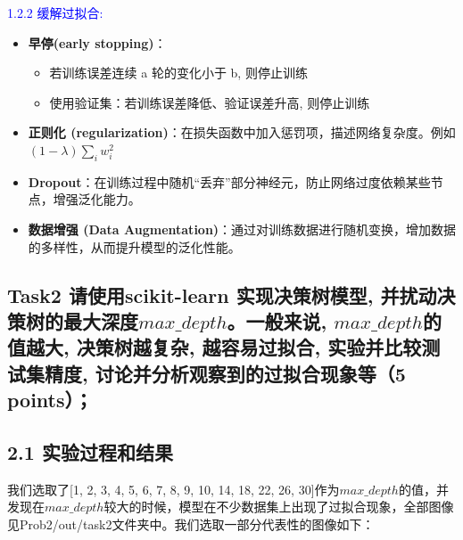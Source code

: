 \documentclass[8pt]{article}
\begin{document}
\textcolor{blue}{1.2.2 缓解过拟合:}
\begin{itemize}
    \item \textbf{早停(early stopping)}：
    \begin{itemize}
        \item 若训练误差连续 a 轮的变化小于 b, 则停止训练
        \item 使用验证集：若训练误差降低、验证误差升高, 则停止训练
    \end{itemize}
    \item \textbf{正则化 (regularization)}：在损失函数中加入惩罚项，描述网络复杂度。例如$(1-\lambda)\sum_{i}{w_i^2} $
    \item \textbf{Dropout}：在训练过程中随机“丢弃”部分神经元，防止网络过度依赖某些节点，增强泛化能力。
    \item \textbf{数据增强 (Data Augmentation)}：通过对训练数据进行随机变换，增加数据的多样性，从而提升模型的泛化性能。
\end{itemize}

\subsection*{Task2 请使用scikit-learn 实现决策树模型, 并扰动决策树的最大深度$max\_ depth$。一般来说, $max\_ depth$的值越大, 决策树越复杂, 越容易过拟合, 实验并比较测试集精度, 讨论并分析观察到的过拟合现象等（5 points）；}


\subsection*{2.1 实验过程和结果}

我们选取了[1, 2, 3, 4, 5, 6, 7, 8, 9, 10, 14, 18, 22, 26, 30]作为$max\_ depth$的值，并发现在$max\_ depth$较大的时候，模型在不少数据集上出现了过拟合现象，全部图像见Prob2/out/task2文件夹中。我们选取一部分代表性的图像如下：
\end{document}

